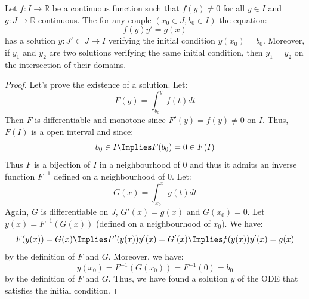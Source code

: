\begin{theorem}
    Let $f: I \to \mathbb{R}$ be a continuous function such that $f(y) \neq 0$ for all $y \in I$ and $g: J \to \mathbb{R}$ continuous. The for any couple $(x_0 \in J, b_0 \in I)$ the equation:
    \[
        f(y) y' = g(x)
    \]
    has a solution $y: J' \subset J \to I$ verifying the initial condition $y(x_0) = b_0$. Moreover, if $y_1$ and $y_2$ are two solutions verifying the same initial condition, then $y_1 = y_2$ on the intersection of their domains.
\end{theorem}
\begin{proof}
    Let's prove the existence of a solution. Let:
    \[
        F(y) = \int_{b_0}^{y} f(t) dt
    \]
    Then $F$ is differentiable and monotone since $F'(y) = f(y) \neq 0$ on $I$. Thus, $F(I)$ is a open interval and since:
    \[
        b_0 \in I \Implies F(b_0) = 0 \in F(I)
    \]
    Thus $F$ is a bijection of $I$ in a neighbourhood of $0$ and thus it admits an inverse function $F^{-1}$ defined on a neighbourhood of $0$. Let:
    \[
        G(x) = \int_{x_0}^{x} g(t) dt
    \]
    Again, $G$ is differentiable on $J$, $G'(x) = g(x)$ and $G(x_0) = 0$. Let $y(x) = F^{-1}(G(x))$ (defined on a neighbourhood of $x_0$). We have:
    \[
        F(y(x)) = G(x) \Implies F'(y(x)) y'(x) = G'(x) \Implies f(y(x)) y'(x) = g(x)
    \]
    by the definition of $F$ and $G$. Moreover, we have:
    \[
        y(x_0) = F^{-1}(G(x_0)) = F^{-1}(0) = b_0
    \]
    by the definition of $F$ and $G$. Thus, we have found a solution $y$ of the ODE that satisfies the initial condition.
\end{proof}

